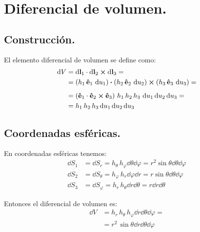 \documentclass[12pt]{article}
\numberwithin{equation}{section}
\begin{document}
\section{Diferencial de volumen.}

\subsection{Construcción.}

El elemento diferencial de volumen se define como:
\begin{align*}
\dd{V} &= \dd{\vb{l}_{1}} \cdot \dd{\vb{l}_{2}} \cp \dd{\vb{l}_{3}} = \\
&= \left( h_{1} \, \vu{e}_{1} \, \dd{u}_{1} \right) \vdot \left( h_{2} \, \vu{e}_{2} \, \dd{u}_{2} \right) \cp \left( h_{3} \, \vu{e}_{3} \, \dd{u}_{3} \right) =  \\[0.5em]
&= \left( \vu{e}_{1} \cdot \vu{e}_{2} \cp \vu{e}_{3} \right) \, h_{1} \, h_{2} \, h_{3} \, \dd{u_{1}} \dd{u_{2}} \dd{u_{3}} = \\ 
&= h_{1} \, h_{2} \, h_{3} \dd{u_{1}} \dd{u_{2}} \dd{u_{3}}
\end{align*}

\subsection{Coordenadas esféricas.}

En coordenadas esféricas tenemos:
\begin{align*}
\dd{S_{1}} &= \dd{S_{r}} = h_{\theta} \, h_{\varphi} \dd{\theta} \dd{\varphi} = r^{2} \sin \theta \dd{\theta} \dd{\varphi} \\[0.5em]
\dd{S_{2}} &= \dd{S_{\theta}} = h_{\varphi} \, h_{r} \dd{\varphi} \dd{r} = r \sin \theta \dd{\theta} \dd{\varphi} \\[0.5em]
\dd{S_{3}} &= \dd{S_{\varphi}} = h_{r} \, h_{\theta} \dd{r} \dd{\theta} = r \dd{r} \dd{\theta}
\end{align*}

Entonces el diferencial de volumen es:
\begin{align*}
\dd{V} &= h_{r} \, h_{\theta} \, h_{\varphi} \dd{r} \dd{\theta} \dd{\varphi} = \\[0.5em]
&= r^{2} \, \sin \theta \dd{r} \dd{\theta} \dd{\varphi}
\end{align*}

\end{document}
